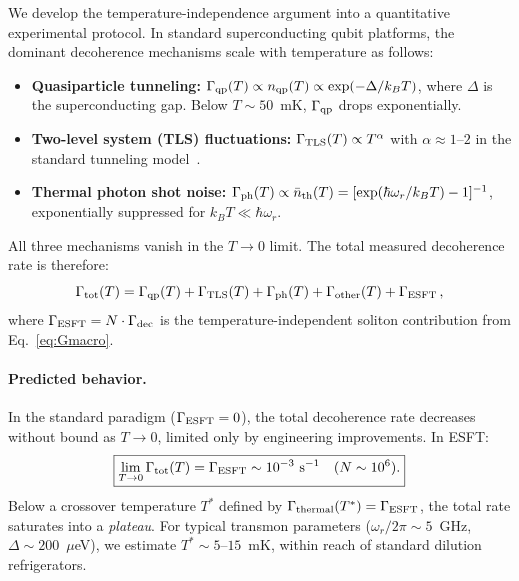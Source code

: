 ﻿\documentclass[a4paper,12pt]{article}
\begin{document}
We develop the temperature-independence argument into a quantitative
experimental protocol.  In standard superconducting qubit platforms,
the dominant decoherence mechanisms scale with temperature as follows:
\begin{itemize}
  \item \textbf{Quasiparticle tunneling:}
    $\Gamma_{\rm qp}(T) \propto n_{\rm qp}(T)
    \propto \exp(-\Delta/k_BT)$, where $\Delta$ is the
    superconducting gap.  Below $T\sim 50$~mK,
    $\Gamma_{\rm qp}$ drops exponentially.
  \item \textbf{Two-level system (TLS) fluctuations:}
    $\Gamma_{\rm TLS}(T) \propto T^\alpha$ with
    $\alpha\approx 1$--$2$ in the standard tunneling
    model~\cite{Muller2019}.
  \item \textbf{Thermal photon shot noise:}
    $\Gamma_{\rm ph}(T) \propto \bar{n}_{\rm th}(T)
    = [\exp(\hbar\omega_r/k_BT)-1]^{-1}$, exponentially
    suppressed for $k_BT \ll \hbar\omega_r$.
\end{itemize}

All three mechanisms vanish in the $T\to 0$ limit.  The total
measured decoherence rate is therefore:
\begin{equation}
  \Gamma_{\rm tot}(T) = \Gamma_{\rm qp}(T)
    + \Gamma_{\rm TLS}(T) + \Gamma_{\rm ph}(T)
    + \Gamma_{\rm other}(T) + \Gamma_{\rm ESFT}\,,
  \label{eq:Gtot}
\end{equation}
where $\Gamma_{\rm ESFT} = N\cdot\Gamma_{\rm dec}$ is the
temperature-independent soliton contribution from
Eq.~\eqref{eq:Gmacro}.

\paragraph{Predicted behavior.}
In the standard paradigm ($\Gamma_{\rm ESFT}=0$), the total
decoherence rate decreases without bound as $T\to 0$, limited
only by engineering improvements.  In ESFT:
\begin{equation}
  \boxed{\lim_{T\to 0}\Gamma_{\rm tot}(T)
    = \Gamma_{\rm ESFT} \sim 10^{-3}~\text{s}^{-1}
    \quad (N\sim 10^6).}
  \label{eq:plateau}
\end{equation}
Below a crossover temperature $T^*$ defined by
$\Gamma_{\rm thermal}(T^*) = \Gamma_{\rm ESFT}$,
the total rate saturates into a \emph{plateau}.  For
typical transmon parameters ($\omega_r/2\pi \sim 5$~GHz,
$\Delta\sim 200$~$\mu$eV), we estimate $T^*\sim 5$--$15$~mK,
within reach of standard dilution refrigerators.
\end{document}
